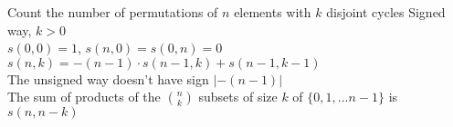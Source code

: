 Count the number of permutations of $n$ elements with $k$ disjoint cycles
Signed way, $k > 0$ \\

$s(0, 0) = 1$, $s(n, 0) = s(0, n) = 0$ \\
$s(n, k) = -(n-1) \cdot s(n - 1, k) + s(n - 1, k - 1)$ \\

The unsigned way doesn't have sign $|-(n - 1)|$ \\

The sum of products of the $n \choose k$ subsets of size $k$ of $\{0, 1, ... n -1\}$ is $s(n, n - k)$ \\